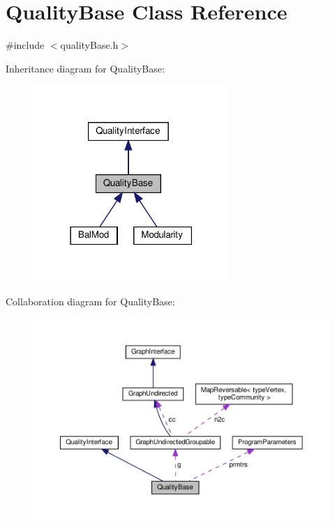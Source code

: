 \hypertarget{classQualityBase}{}\section{Quality\+Base Class Reference}
\label{classQualityBase}


{\ttfamily \#include $<$quality\+Base.\+h$>$}



Inheritance diagram for Quality\+Base\+:
\nopagebreak
\begin{figure}[H]
\begin{center}
\leavevmode
\includegraphics[width=210pt]{classQualityBase__inherit__graph}
\end{center}
\end{figure}


Collaboration diagram for Quality\+Base\+:
\nopagebreak
\begin{figure}[H]
\begin{center}
\leavevmode
\includegraphics[width=350pt]{classQualityBase__coll__graph}
\end{center}
\end{figure}

